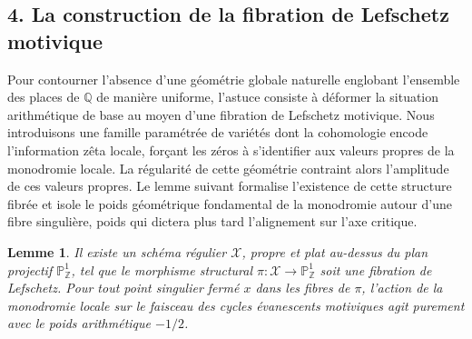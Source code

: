 \documentclass[
]{article}
\newtheorem{lemma}{Lemme}
\begin{document}
\hypertarget{la-construction-de-la-fibration-de-lefschetz-motivique}{%
\subsection{4. La construction de la fibration de Lefschetz motivique}\label{la-construction-de-la-fibration-de-lefschetz-motivique}}

Pour contourner l'absence d'une géométrie globale naturelle englobant l'ensemble des places de $\mathbb{Q}$ de manière uniforme, l'astuce consiste à déformer la situation arithmétique de base au moyen d'une fibration de Lefschetz motivique. Nous introduisons une famille paramétrée de variétés dont la cohomologie encode l'information zêta locale, forçant les zéros à s'identifier aux valeurs propres de la monodromie locale. La régularité de cette géométrie contraint alors l'amplitude de ces valeurs propres. Le lemme suivant formalise l'existence de cette structure fibrée et isole le poids géométrique fondamental de la monodromie autour d'une fibre singulière, poids qui dictera plus tard l'alignement sur l'axe critique.

\begin{lemma}
Il existe un schéma régulier $\mathcal{X}$, propre et plat au-dessus du plan projectif $\mathbb{P}^1_{\mathbb{Z}}$, tel que le morphisme structural $\pi : \mathcal{X} \to \mathbb{P}^1_{\mathbb{Z}}$ soit une fibration de Lefschetz. Pour tout point singulier fermé $x$ dans les fibres de $\pi$, l'action de la monodromie locale sur le faisceau des cycles évanescents motiviques agit purement avec le poids arithmétique $-1/2$.
\end{lemma}
\end{document}
